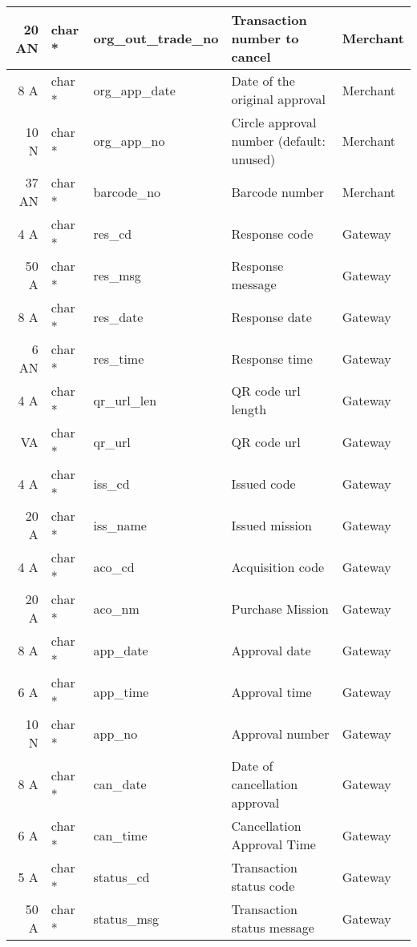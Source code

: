 \documentclass[12pt]{article}
\begin{document}
\begin{center}
\begin{tabular}{ |r |l |l |l |l| }
        \hline
        20 AN & char *  & org\_out\_trade\_no & Transaction number to cancel & Merchant \\
        \hline
        8 A & char *  & org\_app\_date & Date of the original approval & Merchant \\
        \hline
        10 N & char *  & org\_app\_no & Circle approval number (default: unused) & Merchant \\
        \hline
        37 AN & char *  & barcode\_no & Barcode number & Merchant \\
        \hline
        4 A & char *  & res\_cd & Response code & Gateway \\
        \hline
        50 A & char *  & res\_msg & Response message & Gateway \\
        \hline
        8 A & char *  & res\_date & Response date & Gateway \\
        \hline
        6 AN & char *  & res\_time & Response time & Gateway \\
        \hline
        4 A & char *  & qr\_url\_len & QR code url length & Gateway \\
        \hline
        VA & char *  & qr\_url & QR code url & Gateway \\
        \hline
        4 A & char *  & iss\_cd & Issued code & Gateway \\
        \hline
        20 A & char *  & iss\_name & Issued mission & Gateway \\
        \hline
        4 A & char *  & aco\_cd & Acquisition code & Gateway \\
        \hline
        20 A & char *  & aco\_nm & Purchase Mission & Gateway \\

        \hline
        8 A & char *  & app\_date & Approval date & Gateway \\
        \hline
        6 A & char *  & app\_time & Approval time & Gateway \\
        \hline
        10 N & char *  & app\_no & Approval number & Gateway \\

        \hline
        8 A & char *  & can\_date & Date of cancellation approval & Gateway \\
        \hline
        6 A & char *  & can\_time & Cancellation Approval Time & Gateway \\
        
        \hline
        5 A & char *  & status\_cd & Transaction status code & Gateway \\
        \hline
        50 A & char *  & status\_msg & Transaction status message & Gateway \\
        \hline
       
    \end{tabular}
\end{center}
\end{document}
